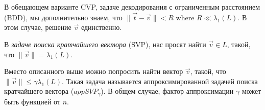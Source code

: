 \documentclass[a4paper,11pt]{article}
\begin{document}
В обещающем варианте CVP, задаче декодирования с ограниченным расстоянием (BDD), мы дополнительно знаем, что $\| \vec{t} - \vec{v} \| < R$ where $R \ll \lambda_1(L)$. В этом случае, решение $\vec{v}$ единственно.

В \emph{задаче поиска кратчайшего вектора} (SVP), нас просят найти $\vec{v}\in L$, такой, что $\| \vec{v} \| = \lambda_1 (L)$.

Вместо описанного выше можно попросить найти вектор $\vec{v}$, такой, что $\| \vec{v} \| \leq \gamma \lambda_1 (L)$. Такая задача называется аппроксимированной задачей поиска кратчайшего вектора ($appSVP_{\gamma}$). В общем случае, фактор аппроксимации $\gamma$ может быть функцией от $n$.
\end{document}
